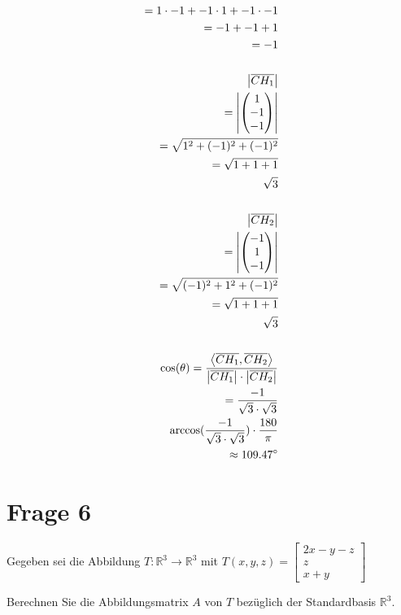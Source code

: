 \begin{align*}
    = 1 \cdot -1 + -1 \cdot 1 + -1 \cdot -1 \\
    = -1 + -1 + 1 \\
    = -1 \\\\ \pagebreak[2]
    \left|\overline{CH_1}\right| \\
    = \left|\begin{pmatrix}
        1 \\ -1 \\ -1
    \end{pmatrix}\right| \\
    = \sqrt{1^2 + (-1)^2 + (-1)^2} \\
    = \sqrt{1 + 1 + 1} \\
    \sqrt{3} \\\\ \pagebreak[2]
    \left|\overline{CH_2}\right| \\
    = \left|\begin{pmatrix}
        -1 \\ 1 \\ -1
    \end{pmatrix}\right| \\
    = \sqrt{(-1)^2 + 1^2 + (-1)^2} \\
    = \sqrt{1 + 1 + 1} \\
    \sqrt{3} \\\\ \pagebreak[2]
    \cos(\theta) = \frac{\left\langle \overline{CH_1}, \overline{CH_2} \right\rangle}{\left|\overline{CH_1}\right| \cdot \left|\overline{CH_2}\right|} \\
    = \frac{-1}{\sqrt{3} \cdot \sqrt{3}} \\
    \arccos(\frac{-1}{\sqrt{3} \cdot \sqrt{3}}) \cdot \frac{180}{\pi} \\
    \approx 109.47^\circ
\end{align*}

\section{Frage 6}

Gegeben sei die Abbildung $T : \mathbb{R}^3 \rightarrow \mathbb{R}^3$ mit $T(x,y,z) = \begin{bmatrix}
    2x - y - z \\
    z \\
    x + y
\end{bmatrix}$

Berechnen Sie die Abbildungsmatrix $A$ von $T$ bezüglich der Standardbasis $\mathbb{R}^3$.

